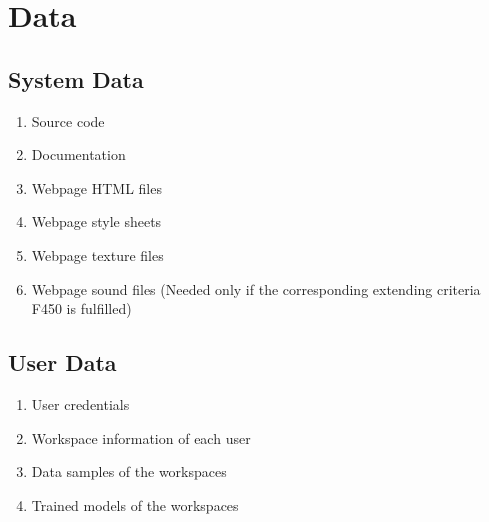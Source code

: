 \section{Data}
\subsection{System Data}
\begin{enumerate}[{label = \textbf{/D{\protect\twodigits{\arabic{enumi}}}0/}, leftmargin = *}]
    \item Source code   %
    \item Documentation %
    \item Webpage HTML files
    \item Webpage style sheets
    \item Webpage texture files
    \item Webpage sound files (Needed only if the corresponding extending criteria F450 is fulfilled)
\end{enumerate}

\subsection{User Data}
\begin{enumerate}[resume*]
    \item User credentials
    \item Workspace information of each user
    \item Data samples of the workspaces
    \item Trained models of the workspaces
\end{enumerate}
